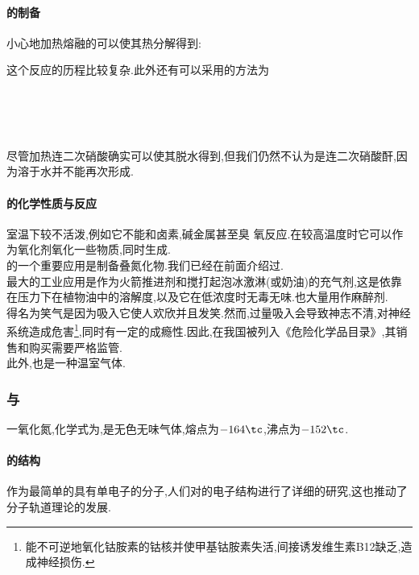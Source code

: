 \documentclass{ctexart}
\begin{document}
\paragraph{的制备}
小心地加热熔融的可以使其热分解得到:
\begin{center}
\end{center}
这个反应的历程比较复杂.此外还有可以采用的方法为
\begin{center}
    \\
    \\
    \ \ \ \ \ 
\end{center}
尽管加热连二次硝酸确实可以使其脱水得到,但我们仍然不认为是连二次硝酸酐,因为溶于水并不能再次形成.
\paragraph{的化学性质与反应}
室温下较不活泼,例如它不能和卤素,碱金属甚至臭
氧反应.在较高温度时它可以作为氧化剂氧化一些物质,同时生成.\\
\indent {}的一个重要应用是制备叠氮化物.我们已经在前面介绍过.\\
\indent {}最大的工业应用是作为火箭推进剂和搅打起泡冰激淋(或奶油)的充气剂,这是依靠在压力下在植物油中的溶解度,以及它在低浓度时无毒无味.也大量用作麻醉剂.\\
\indent {}得名为笑气是因为吸入它使人欢欣并且发笑.然而,过量吸入会导致神志不清,对神经系统造成危害\footnote{能不可逆地氧化钴胺素的钴核并使甲基钴胺素失活,间接诱发维生素B12缺乏,造成神经损伤.},同时有一定的成瘾性.因此,在我国被列入《危险化学品目录》,其销售和购买需要严格监管.\\
\indent 此外,也是一种温室气体.
\subsubsection{与}
\begin{substance}[\ce{NO}]
    一氧化氮,化学式为,是无色无味气体,熔点为$-164\tc$,沸点为$-152\tc$.
\end{substance}
\paragraph{的结构}
作为最简单的具有单电子的分子,人们对的电子结构进行了详细的研究,这也推动了分子轨道理论的发展.
\end{document}

